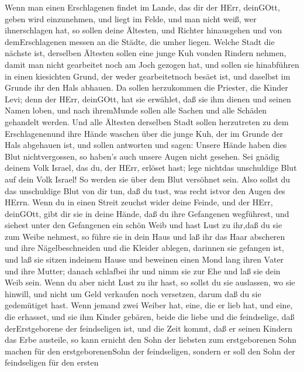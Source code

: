  Wenn man einen Erschlagenen findet im Lande, das dir der
HErr, deinGOtt, geben wird einzunehmen, und liegt im Felde, und man
nicht weiß, wer ihnerschlagen hat,  so sollen deine
Ältesten, und Richter hinausgehen und von demErschlagenen messen an die
Städte, die umher liegen.  Welche Stadt die nächste ist,
derselben Ältesten sollen eine junge Kuh vonden Rindern nehmen, damit
man nicht gearbeitet noch am Joch gezogen hat,  und sollen
sie hinabführen in einen kiesichten Grund, der weder gearbeitetnoch
besäet ist, und daselbst im Grunde ihr den Hals abhauen.  Da
sollen herzukommen die Priester, die Kinder Levi; denn der HErr,
deinGOtt, hat sie erwählet, daß sie ihm dienen und seinen Namen loben,
und nach ihremMunde sollen alle Sachen und alle Schäden gehandelt
werden.  Und alle Ältesten derselben Stadt sollen
herzutreten zu dem Erschlagenenund ihre Hände waschen über die junge
Kuh, der im Grunde der Hals abgehauen ist,  und sollen
antworten und sagen: Unsere Hände haben dies Blut nichtvergossen, so
haben's auch unsere Augen nicht gesehen.  Sei gnädig deinem
Volk Israel, das du, der HErr, erlöset hast; lege nichtdas unschuldige
Blut auf dein Volk Israel! So werden sie über dem Blut versöhnet sein.
 Also sollst du das unschuldige Blut von dir tun, daß du
tust, was recht istvor den Augen des HErrn.  Wenn du in
einen Streit zeuchst wider deine Feinde, und der HErr, deinGOtt, gibt
dir sie in deine Hände, daß du ihre Gefangenen wegführest, 
und siehest unter den Gefangenen ein schön Weib und hast Lust zu ihr,daß
du sie zum Weibe nehmest,  so führe sie in dein Haus und
laß ihr das Haar abscheren und ihre Nägelbeschneiden  und
die Kleider ablegen, darinnen sie gefangen ist, und laß sie sitzen
indeinem Hause und beweinen einen Mond lang ihren Vater und ihre Mutter;
danach schlafbei ihr und nimm sie zur Ehe und laß sie dein Weib sein.
 Wenn du aber nicht Lust zu ihr hast, so sollst du sie
auslassen, wo sie hinwill, und nicht um Geld verkaufen noch versetzen,
darum daß du sie gedemütiget hast.  Wenn jemand zwei Weiber
hat, eine, die er lieb hat, und eine, die erhasset, und sie ihm Kinder
gebären, beide die liebe und die feindselige, daß derErstgeborene der
feindseligen ist,  und die Zeit kommt, daß er seinen
Kindern das Erbe austeile, so kann ernicht den Sohn der liebsten zum
erstgeborenen Sohn machen für den erstgeborenenSohn der feindseligen,
 sondern er soll den Sohn der feindseligen für den ersten
